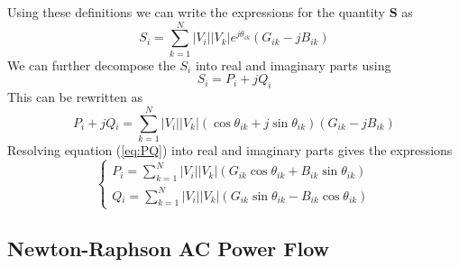 \documentclass[12pt]{article}
\begin{document}
Using these definitions we can write the expressions for the quantity
$\mathbf{S}$ as
\begin{equation}
\label{eq:S}
S_{i}=\sum_{k=1}^{N}|V{_i}||V{_k}|e^{j\theta_{ik}}\left ( G_{ik}-jB_{ik} \right )
\end{equation} 
We can further decompose the $S_i$ into real and imaginary parts using
\begin{equation}
S_{i}=P_{i}+jQ_{i}
\end{equation} 
This can be rewritten as
\begin{equation}\label{eq:PQ}
P{_i}+jQ{_i}=\sum_{k=1}^{N}|V{_i}||V{_k}|\left ( \cos\theta_{ik}+j\sin\theta_{ik} \right )\left ( G_{ik}-jB_{ik} \right )
\end{equation} 
Resolving equation (\ref{eq:PQ}) into real and imaginary parts gives the
expressions
\begin{equation}\label{eq:PiQi}
\begin{cases}
P{_i}=\sum_{k=1}^{N}|V{_i}||V{_k}|\left (G_{ik}\cos\theta_{ik}+B_{ik}\sin\theta_{ik} \right ) \\
Q{_i}=\sum_{k=1}^{N}|V{_i}||V{_k}|\left (G_{ik}\sin\theta_{ik}-B_{ik}\cos\theta_{ik} \right )
\end{cases}
\end{equation} 

\subsection*{Newton-Raphson AC Power Flow}
\end{document}
